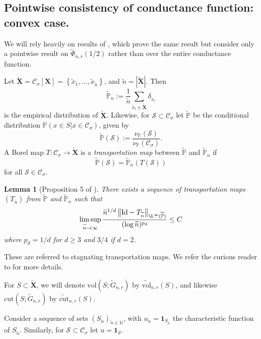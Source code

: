 \documentclass{article}
\newcommand{\set}[1]{\left\{#1\right\}}
\newcommand{\vol}{\mathrm{vol}}
\newcommand{\abs}[1]{\left \lvert #1 \right \rvert}
\newcommand{\norm}[1]{\left\lVert#1\right\rVert}
\newcommand{\1}{\mathbf{1}}
\newcommand{\Id}{\mathrm{Id}}
\newcommand{\cut}{\mathrm{cut}}
\newcommand{\Xbf}{\mathbf{X}}
\newcommand{\Pbb}{\mathbb{P}}
\newcommand{\Sset}{\mathcal{S}}
\newcommand{\Cset}{\mathcal{C}}
\newcommand{\Csig}{\Cset_{\sigma}}
\newcommand{\wn}{\widetilde{n}}
\newcommand{\wX}{\widetilde{\Xbf}}
\newcommand{\wx}{\widetilde{x}}
\theoremstyle{aldenthm}
\newtheorem{lemma}{Lemma}
\begin{document}
\subsection{Pointwise consistency of conductance function: convex case.}
\label{sec: pointwise_consistency_of_conductance_function}

We will rely heavily on results of \cite{garciatrillos16}, which prove the same result but consider only a pointwise result on $\widetilde{\Phi}_{n,r}(1/2)$ rather than over the entire conductance function.

Let $\wX = \Csig[\Xbf] = \set{\wx_1, \ldots, \wx_{\wn}}$, and $\wn = \abs{\wX}$. Then
\begin{equation*}
\widetilde{\Pbb}_n := \frac{1}{\wn} \sum_{\wx_i \in \wX} \delta_{\wx_i}
\end{equation*}
is the empirical distribution of $\wX$. Likewise, for $\Sset \subset \Csig$ let $\widetilde{\Pbb}$ be the conditional distribution $\Pbb(x \in S \vert x \in \Csig)$, given by
\begin{equation*}
\widetilde{\Pbb}(\Sset) := \frac{\nu_{\Pbb}(\Sset)}{\nu_{\Pbb}(\Csig)}.
\end{equation*}
A Borel map $T: \Csig \to \wX$ is a \emph{transportation map} between $\widetilde{\Pbb}$ and $\widetilde{\Pbb}_n$ if
\begin{equation*}
\widetilde{\Pbb}(\Sset) = \widetilde{\Pbb}_n(T(\Sset))
\end{equation*}
for all $\Sset \in \Csig$. 

\begin{lemma}[Proposition 5 of \cite{garciatrillos16}]
	There exists a sequence of transportation maps $(T_{\wn})$ from $\widetilde{\Pbb}$ and $\widetilde{\Pbb}_n$ such that
	\begin{equation*}
	\limsup_{\wn \to \infty} \frac{\wn^{1/d} \norm{\Id - T_{\wn}}_{\L^{\infty}(\widetilde{\Pbb})}}{(\log \wn)^{p_d} } \leq C
	\end{equation*}
	where $p_d = 1/d$ for $d \geq 3$ and $3/4$ if $d = 2$. 
\end{lemma}
These are referred to stagnating transportation maps. We refer the curious reader to \cite{garciatrillos16} for more details.

For $S \subset \wX$, we will denote $\vol(S; \widetilde{G}_{n,r})$ by $\widetilde{\vol}_{n,r}(S)$, and likewise $\cut(S; \widetilde{G}_{n,r})$ by $\widetilde{\cut}_{n,r}(S)$.

Consider a sequence of sets $(S_{\wn})_{\wn \in \mathbb{N}}$, with $u_{\wn} = \1_{S_{\wn}}$ the characteristic function of $S_{\wn}$. Similarly, for $\Sset \subset \Csig$ let $u = \1_{\Sset}$. 
\end{document}
